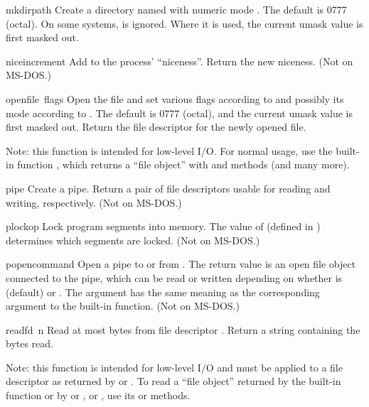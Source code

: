 \begin{funcdesc}{mkdir}{path}
Create a directory named  with numeric mode .
The default  is 0777 (octal).  On some systems, 
is ignored.  Where it is used, the current umask value is first
masked out.
\end{funcdesc}

\begin{funcdesc}{nice}{increment}
Add  to the process' ``niceness''.  Return the new niceness.
(Not on MS-DOS.)
\end{funcdesc}

\begin{funcdesc}{open}{file\, flags}
Open the file  and set various flags according to
 and possibly its mode according to .
The default  is 0777 (octal), and the current umask value is
first masked out.  Return the file descriptor for the newly opened
file.

Note: this function is intended for low-level I/O.  For normal usage,
use the built-in function , which returns a ``file object''
with  and   methods (and many more).
\end{funcdesc}

\begin{funcdesc}{pipe}{}
Create a pipe.  Return a pair of file descriptors 
usable for reading and writing, respectively.
(Not on MS-DOS.)
\end{funcdesc}

\begin{funcdesc}{plock}{op}
Lock program segments into memory.  The value of 
(defined in ) determines which segments are locked.
(Not on MS-DOS.)
\end{funcdesc}

\begin{funcdesc}{popen}{command}
Open a pipe to or from .  The return value is an open
file object connected to the pipe, which can be read or written
depending on whether  is  (default) or .
The  argument has the same meaning as the corresponding
argument to the built-in  function.
(Not on MS-DOS.)
\end{funcdesc}

\begin{funcdesc}{read}{fd\, n}
Read at most  bytes from file descriptor .
Return a string containing the bytes read.

Note: this function is intended for low-level I/O and must be applied
to a file descriptor as returned by  or
.  To read a ``file object'' returned by the
built-in function  or by  or
, or , use its
 or  methods.
\end{funcdesc}

